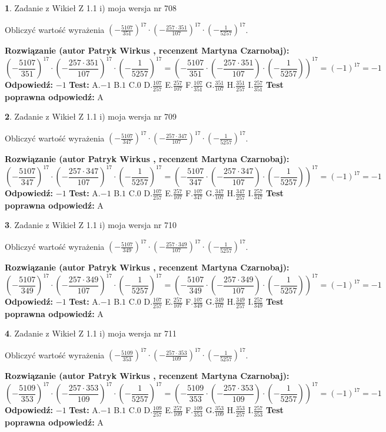 \documentclass[12pt, a4paper]{article}
\theoremstyle{definition} %
\newtheorem{zad}{}
\newcommand{\zadStart}[1]{\begin{zad}#1\newline}
\newcommand{\zadStop}{\end{zad}}
\newcommand{\rozwStart}[2]{\noindent \textbf{Rozwiązanie (autor #1 , recenzent #2): }\newline}
\newcommand{\rozwStop}{\newline}
\newcommand{\odpStart}{\noindent \textbf{Odpowiedź:}\newline}
\newcommand{\odpStop}{\newline}
\newcommand{\testStart}{\noindent \textbf{Test:}\newline}
\newcommand{\testStop}{\newline}
\newcommand{\kluczStart}{\noindent \textbf{Test poprawna odpowiedź:}\newline}
\newcommand{\kluczStop}{\newline}
\begin{document}
\zadStart{Zadanie z Wikieł Z 1.1 i) moja wersja nr 708}

Obliczyć wartość wyrażenia $(-\frac{5107}{351})^{17} \cdot (-\frac{257 \cdot 351}{107})^{17} \cdot (-\frac{1}{5257})^{17}$.
\zadStop
\rozwStart{Patryk Wirkus}{Martyna Czarnobaj}
$$(-\frac{5107}{351})^{17} \cdot (-\frac{257 \cdot 351}{107})^{17} \cdot (-\frac{1}{5257})^{17} = (-\frac{5107}{351} \cdot (-\frac{257 \cdot 351}{107}) \cdot (-\frac{1}{5257}))^{17} = (-1)^{17} = -1$$
\rozwStop
\odpStart
$-1$
\odpStop
\testStart
A.$-1$ B.$1$ C.$0$ D.$\frac{107}{257}$ E.$\frac{257}{107}$
F.$\frac{107}{351}$ G.$\frac{351}{107}$
H.$\frac{351}{257}$
I.$\frac{257}{351}$
\testStop
\kluczStart
A
\kluczStop



\zadStart{Zadanie z Wikieł Z 1.1 i) moja wersja nr 709}

Obliczyć wartość wyrażenia $(-\frac{5107}{347})^{17} \cdot (-\frac{257 \cdot 347}{107})^{17} \cdot (-\frac{1}{5257})^{17}$.
\zadStop
\rozwStart{Patryk Wirkus}{Martyna Czarnobaj}
$$(-\frac{5107}{347})^{17} \cdot (-\frac{257 \cdot 347}{107})^{17} \cdot (-\frac{1}{5257})^{17} = (-\frac{5107}{347} \cdot (-\frac{257 \cdot 347}{107}) \cdot (-\frac{1}{5257}))^{17} = (-1)^{17} = -1$$
\rozwStop
\odpStart
$-1$
\odpStop
\testStart
A.$-1$ B.$1$ C.$0$ D.$\frac{107}{257}$ E.$\frac{257}{107}$
F.$\frac{107}{347}$ G.$\frac{347}{107}$
H.$\frac{347}{257}$
I.$\frac{257}{347}$
\testStop
\kluczStart
A
\kluczStop



\zadStart{Zadanie z Wikieł Z 1.1 i) moja wersja nr 710}

Obliczyć wartość wyrażenia $(-\frac{5107}{349})^{17} \cdot (-\frac{257 \cdot 349}{107})^{17} \cdot (-\frac{1}{5257})^{17}$.
\zadStop
\rozwStart{Patryk Wirkus}{Martyna Czarnobaj}
$$(-\frac{5107}{349})^{17} \cdot (-\frac{257 \cdot 349}{107})^{17} \cdot (-\frac{1}{5257})^{17} = (-\frac{5107}{349} \cdot (-\frac{257 \cdot 349}{107}) \cdot (-\frac{1}{5257}))^{17} = (-1)^{17} = -1$$
\rozwStop
\odpStart
$-1$
\odpStop
\testStart
A.$-1$ B.$1$ C.$0$ D.$\frac{107}{257}$ E.$\frac{257}{107}$
F.$\frac{107}{349}$ G.$\frac{349}{107}$
H.$\frac{349}{257}$
I.$\frac{257}{349}$
\testStop
\kluczStart
A
\kluczStop



\zadStart{Zadanie z Wikieł Z 1.1 i) moja wersja nr 711}

Obliczyć wartość wyrażenia $(-\frac{5109}{353})^{17} \cdot (-\frac{257 \cdot 353}{109})^{17} \cdot (-\frac{1}{5257})^{17}$.
\zadStop
\rozwStart{Patryk Wirkus}{Martyna Czarnobaj}
$$(-\frac{5109}{353})^{17} \cdot (-\frac{257 \cdot 353}{109})^{17} \cdot (-\frac{1}{5257})^{17} = (-\frac{5109}{353} \cdot (-\frac{257 \cdot 353}{109}) \cdot (-\frac{1}{5257}))^{17} = (-1)^{17} = -1$$
\rozwStop
\odpStart
$-1$
\odpStop
\testStart
A.$-1$ B.$1$ C.$0$ D.$\frac{109}{257}$ E.$\frac{257}{109}$
F.$\frac{109}{353}$ G.$\frac{353}{109}$
H.$\frac{353}{257}$
I.$\frac{257}{353}$
\testStop
\kluczStart
A
\kluczStop
\end{document}
